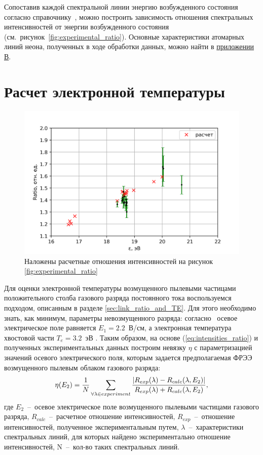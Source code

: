 Сопоставив каждой спектральной линии энергию возбужденного состояния согласно справочнику~\cite{Stritanov1966},
можно построить зависимость отношения спектральных интенсивностей от энергии возбужденного состояния (см.~рисунок~\ref{fig:experimental_ratio}).
Основные характеристики атомарных линий неона, полученных в ходе обработки данных, можно найти в \hyperref[app:app3]{приложении В}.

\section{Расчет электронной температуры}
\begin{figure}[t]
  \centering
  \includegraphics[width=16cm]{figures/Intensities_ratio}
  \caption{Наложены расчетные отношения интенсивностей на рисунок \ref{fig:experimental_ratio}}
  \label{fig:Intensities_ratio}
\end{figure}

Для оценки электронной температуры возмущенного пылевыми частицами положительного столба газового разряда постоянного
тока воспользуемся подходом, описанным в разделе \ref{sec:link_ratio_and_TE}. Для этого необходимо знать, как минимум,
параметры невозмущенного разряда: согласно~\cite{Pustylnik} осевое электрическое поле равняется $E_1 = 2.2$~В/см, а
электронная температура хвостовой части $T_e = 3.2$~эВ \cite{Zobnin2018}. Таким образом, на основе
(\ref{eq:intensities_ratio}) и полученных экспериментальных данных построим невязку $\eta$ с параметризацией значений
осевого электрического поля, которым задается предполагаемая ФРЭЭ возмущенного пылевым облаком газового разряда:
\begin{equation}
    \eta(E_2) = {1 \over N} \sum_{\forall \lambda \in experiment}{|R_{exp}(\lambda) - R_{calc}(\lambda, E_2)| \over {R_{exp}(\lambda) + R_{calc}(\lambda, E_2)}},
\end{equation}
где $E_2$~--~осевое электрическое поле возмущенного пылевыми частицами газового разряда, $R_{calc}$~--~расчетное
отношение интенсивностей, $R_{exp}$~--~отношение интенсивностей, полученное экспериментальным путем, $\lambda$~--~характеристики
спектральных линий, для которых найдено экспериментально отношение интенсивностей, N~--~кол-во таких спектральных линий.

